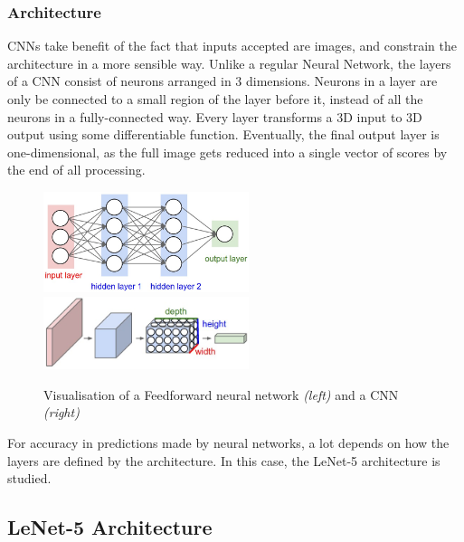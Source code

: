 \subsubsection{Architecture}
\label{sect5_1_2_1}
CNNs take benefit of the fact that inputs accepted are images, and constrain the architecture in a more sensible way. Unlike a regular Neural Network, the layers of a CNN consist of neurons arranged in 3 dimensions. Neurons in a layer are only be connected to a small region of the layer before it, instead of all the neurons in a fully-connected way. Every layer transforms a 3D input to 3D output using some differentiable function. Eventually, the final output layer is one-dimensional, as the full image gets reduced into a single vector of scores by the end of all processing.

\begin{figure}[h!]
\centering
\includegraphics[width=6cm]{figures/Neural_Net.png}
\hspace{7mm}
\includegraphics[width=6cm]{figures/cnn.png}
\caption{Visualisation of a Feedforward neural network \textit{(left)} and a CNN \textit{(right)}}
\label{fig:cnn6}
\end{figure}

For accuracy in predictions made by neural networks, a lot depends on how the layers are defined by the architecture. In this case, the LeNet-5 architecture is studied. 

\subsection*{LeNet-5 Architecture}
\label{sect5_1_2_1a}

